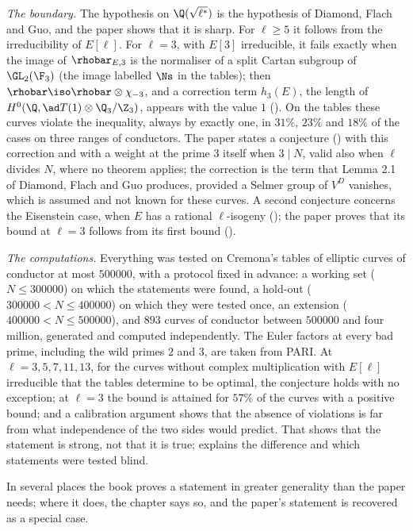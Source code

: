 \emph{The boundary.} The hypothesis on $\Q(\sqrt{\ell^*})$ is the hypothesis of Diamond, Flach
and Guo, and the paper shows that it is sharp. For $\ell\ge5$ it follows from the irreducibility of
$E[\ell]$. For $\ell=3$, with $E[3]$ irreducible, it fails exactly when the image of
$\rhobar_{E,3}$ is the normaliser of a split Cartan subgroup of $\GL_2(\F_3)$ (the image labelled
$\Ns$ in the tables); then $\rhobar\iso\rhobar\otimes\chi_{-3}$, and a correction term $h_3(E)$,
the length of $H^0(\Q,\ad T(1)\otimes\Q_3/\Z_3)$, appears with the value $1$
(). On the tables these curves violate the inequality, always by
exactly one, in $31\%$, $23\%$ and $18\%$ of the cases on three ranges of conductors. The paper
states a conjecture () with this correction and with a weight at
the prime $3$ itself when $3\mid N$, valid also when $\ell$ divides $N$, where no theorem applies;
the correction is the term that Lemma 2.1 of Diamond, Flach and Guo produces, provided a Selmer
group of $V^D$ vanishes, which is assumed and not known for these curves. A second conjecture
concerns the Eisenstein case, when $E$ has a rational $\ell$-isogeny
(); the paper proves that its bound at $\ell=3$ follows from its
first bound ().

\emph{The computations.} Everything was tested on Cremona's tables of elliptic curves of
conductor at most $500000$, with a protocol fixed in advance: a working set ($N\le300000$) on
which the statements were found, a hold-out ($300000<N\le400000$) on which they were tested once,
an extension ($400000<N\le500000$), and $893$ curves of conductor between $500000$ and four
million, generated and computed independently. The Euler factors at every bad prime, including the
wild primes $2$ and $3$, are taken from PARI. At $\ell=3,5,7,11,13$, for the curves without
complex multiplication with $E[\ell]$ irreducible that the tables determine to be optimal, the
conjecture holds with no exception; at $\ell=3$ the bound is attained for $57\%$ of the curves with
a positive bound; and a calibration argument shows that the absence of violations is far from what
independence of the two sides would predict. That shows that the statement is strong, not that it
is true;  explains the difference and which statements were tested blind.

In several places the book proves a statement in greater generality than the paper needs; where it
does, the chapter says so, and the paper's statement is recovered as a special case.


